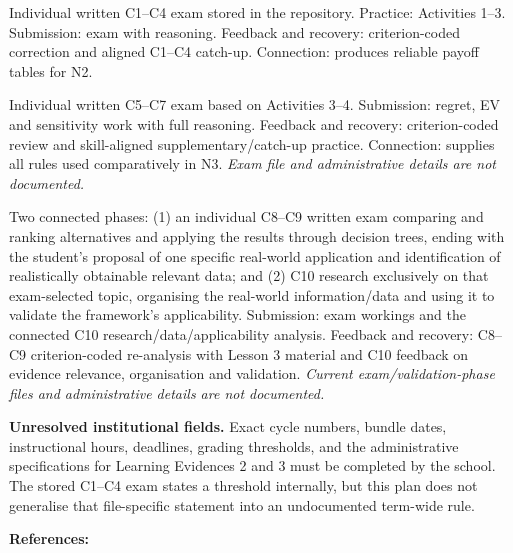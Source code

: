 \documentclass[10pt,letterpaper]{article}
\begin{document}
	\vspace{0.20in}
	\begin{bluebox}
		\fontsize{8.65}{10.9}\selectfont
		\begin{description}[leftmargin=1.55in,style=nextline,itemsep=5pt]
			\item[First Learning Evidence] Individual written C1--C4 exam stored in the repository. Practice: Activities 1--3. Submission: exam with reasoning. Feedback and recovery: criterion-coded correction and aligned C1--C4 catch-up. Connection: produces reliable payoff tables for N2.
			\item[Second Learning Evidence] Individual written C5--C7 exam based on Activities 3--4. Submission: regret, EV and sensitivity work with full reasoning. Feedback and recovery: criterion-coded review and skill-aligned supplementary/catch-up practice. Connection: supplies all rules used comparatively in N3. \textit{Exam file and administrative details are not documented.}
			\item[Third Learning Evidence] Two connected phases: (1) an individual C8--C9 written exam comparing and ranking alternatives and applying the results through decision trees, ending with the student's proposal of one specific real-world application and identification of realistically obtainable relevant data; and (2) C10 research exclusively on that exam-selected topic, organising the real-world information/data and using it to validate the framework's applicability. Submission: exam workings and the connected C10 research/data/applicability analysis. Feedback and recovery: C8--C9 criterion-coded re-analysis with Lesson 3 material and C10 feedback on evidence relevance, organisation and validation. \textit{Current exam/validation-phase files and administrative details are not documented.}
		\end{description}
		
		\textbf{Unresolved institutional fields.} Exact cycle numbers, bundle dates,
		instructional hours, deadlines, grading thresholds, and the administrative
		specifications for Learning Evidences 2 and 3 must be completed by the school.
		The stored C1--C4 exam states a threshold internally, but this plan does not
		generalise that file-specific statement into an undocumented term-wide rule.
	\end{bluebox}
	
	\vspace{0.23in}
	{\bfseries\fontsize{12}{14}\selectfont References:}
	
\end{document}
